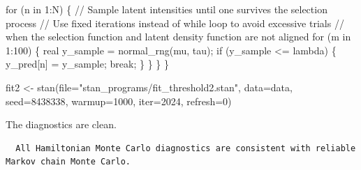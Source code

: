 \documentclass[
  letterpaper,
  DIV=11,
  numbers=noendperiod]{scrartcl}
\newenvironment{Shaded}{\begin{snugshade}}{\end{snugshade}}
\newcommand{\AttributeTok}[1]{\textcolor[rgb]{0.40,0.45,0.13}{#1}}
\newcommand{\CommentTok}[1]{\textcolor[rgb]{0.37,0.37,0.37}{#1}}
\newcommand{\ControlFlowTok}[1]{\textcolor[rgb]{0.00,0.23,0.31}{#1}}
\newcommand{\DataTypeTok}[1]{\textcolor[rgb]{0.68,0.00,0.00}{#1}}
\newcommand{\DecValTok}[1]{\textcolor[rgb]{0.68,0.00,0.00}{#1}}
\newcommand{\FunctionTok}[1]{\textcolor[rgb]{0.28,0.35,0.67}{#1}}
\newcommand{\NormalTok}[1]{\textcolor[rgb]{0.00,0.23,0.31}{#1}}
\newcommand{\OtherTok}[1]{\textcolor[rgb]{0.00,0.23,0.31}{#1}}
\newcommand{\SpecialCharTok}[1]{\textcolor[rgb]{0.37,0.37,0.37}{#1}}
\newcommand{\StringTok}[1]{\textcolor[rgb]{0.13,0.47,0.30}{#1}}
\begin{document}
\begin{codelisting}
\begin{Shaded}
\begin{Highlighting}[]
  \ControlFlowTok{for}\NormalTok{ (n }\ControlFlowTok{in} \DecValTok{1}\NormalTok{:N) \{}
    \CommentTok{// Sample latent intensities until one survives the selection process}
    \CommentTok{// Use fixed iterations instead of while loop to avoid excessive trials}
    \CommentTok{// when the selection function and latent density function are not aligned}
    \ControlFlowTok{for}\NormalTok{ (m }\ControlFlowTok{in} \DecValTok{1}\NormalTok{:}\DecValTok{100}\NormalTok{) \{}
      \DataTypeTok{real}\NormalTok{ y\_sample = normal\_rng(mu, tau);}
      \ControlFlowTok{if}\NormalTok{ (y\_sample \textless{}= lambda) \{ }
\NormalTok{        y\_pred[n] = y\_sample;}
        \ControlFlowTok{break}\NormalTok{;}
\NormalTok{      \}}
\NormalTok{    \}}
\NormalTok{  \} }
\NormalTok{\}}
\end{Highlighting}
\end{Shaded}

\end{codelisting}

\begin{Shaded}
\begin{Highlighting}[]
\NormalTok{fit2 }\OtherTok{\textless{}{-}} \FunctionTok{stan}\NormalTok{(}\AttributeTok{file=}\StringTok{"stan\_programs/fit\_threshold2.stan"}\NormalTok{,}
             \AttributeTok{data=}\NormalTok{data, }\AttributeTok{seed=}\DecValTok{8438338}\NormalTok{,}
             \AttributeTok{warmup=}\DecValTok{1000}\NormalTok{, }\AttributeTok{iter=}\DecValTok{2024}\NormalTok{, }\AttributeTok{refresh=}\DecValTok{0}\NormalTok{)}
\end{Highlighting}
\end{Shaded}

The diagnostics are clean.

\begin{Shaded}
\end{Shaded}

\begin{verbatim}
  All Hamiltonian Monte Carlo diagnostics are consistent with reliable
Markov chain Monte Carlo.
\end{verbatim}
\end{document}
